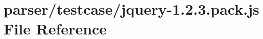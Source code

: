\hypertarget{testcase_2jquery-1_82_83_8pack_8js}{\section{parser/testcase/jquery-\/1.2.3.pack.\+js File Reference}
\label{testcase_2jquery-1_82_83_8pack_8js}
}
